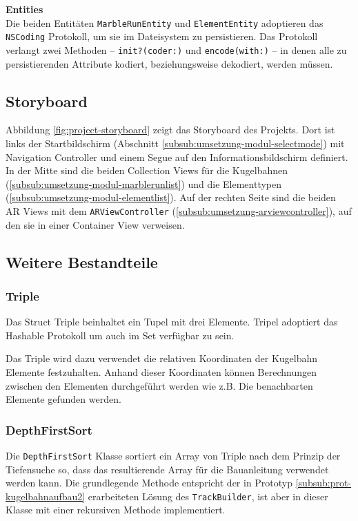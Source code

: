 \textbf{Entities} \\
Die beiden Entitäten \texttt{MarbleRunEntity} und \texttt{ElementEntity} adoptieren das \texttt{NSCoding} Protokoll, um sie im Dateisystem zu persistieren.
Das Protokoll verlangt zwei Methoden – \texttt{init?(coder:)} und \texttt{encode(with:)} – in denen alle zu persistierenden Attribute kodiert, beziehungsweise dekodiert, werden müssen.


\subsection{Storyboard}


Abbildung \ref{fig:project-storyboard} zeigt das Storyboard des Projekts.
Dort ist links der Startbildschirm (Abschnitt \ref{subsub:umsetzung-modul-selectmode}) mit Navigation Controller und einem Segue auf den Informationsbildschirm definiert.
In der Mitte sind die beiden Collection Views für die Kugelbahnen (\ref{subsub:umsetzung-modul-marblerunlist}) und die Elementtypen (\ref{subsub:umsetzung-modul-elementlist}).
Auf der rechten Seite sind die beiden AR Views mit dem \texttt{ARViewController} (\ref{subsub:umsetzung-arviewcontroller}), auf den sie in einer Container View verweisen.


\subsection{Weitere Bestandteile}

\subsubsection{Triple} \label{subsub:umsetzung-triple}
Das Struct Triple beinhaltet ein Tupel mit drei Elemente. Tripel adoptiert das Hashable Protokoll um auch im Set verfügbar zu sein.

Das Triple wird dazu verwendet die relativen Koordinaten der Kugelbahn Elemente festzuhalten. Anhand dieser Koordinaten können Berechnungen zwischen den Elementen durchgeführt werden wie z.B. Die benachbarten Elemente gefunden werden.

\subsubsection{DepthFirstSort} \label{subsub:umsetzung-depthfirst}

Die \texttt{DepthFirstSort} Klasse sortiert ein Array von Triple nach dem Prinzip der Tiefensuche so, dass das resultierende Array für die Bauanleitung verwendet werden kann.
Die grundlegende Methode entspricht der in Prototyp \ref{subsub:prot-kugelbahnaufbau2} erarbeiteten Lösung des \texttt{TrackBuilder}, ist aber in dieser Klasse mit einer rekursiven Methode implementiert.

